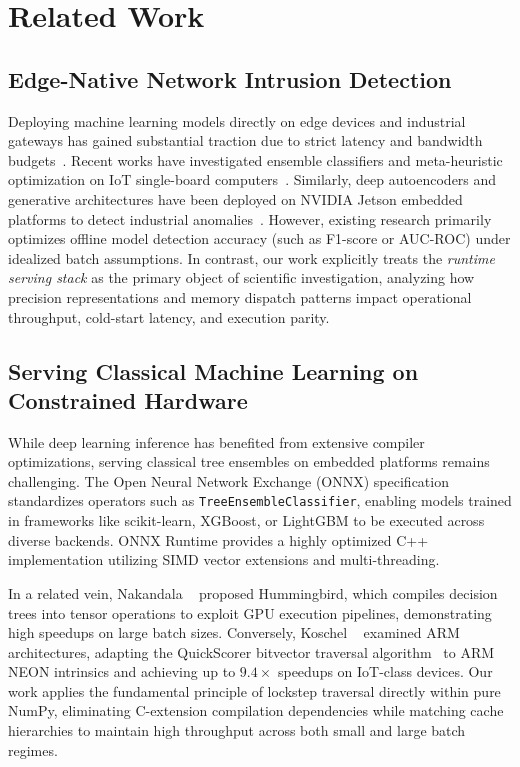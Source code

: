 \section{Related Work}
\label{sec:related_work}

\subsection{Edge-Native Network Intrusion Detection}
Deploying machine learning models directly on edge devices and industrial gateways has gained substantial traction due to strict latency and bandwidth budgets~\cite{sforzin2016rpids}. Recent works have investigated ensemble classifiers and meta-heuristic optimization on IoT single-board computers~\cite{baalaji2025ensemble,asghar2026hedid,zhang2026edgeics}. Similarly, deep autoencoders and generative architectures have been deployed on NVIDIA Jetson embedded platforms to detect industrial anomalies~\cite{hasan2025iiot,diazgorrin2026jetson}. However, existing research primarily optimizes offline model detection accuracy (such as F1-score or AUC-ROC) under idealized batch assumptions. In contrast, our work explicitly treats the \emph{runtime serving stack} as the primary object of scientific investigation, analyzing how precision representations and memory dispatch patterns impact operational throughput, cold-start latency, and execution parity.

\subsection{Serving Classical Machine Learning on Constrained Hardware}
While deep learning inference has benefited from extensive compiler optimizations, serving classical tree ensembles on embedded platforms remains challenging. The Open Neural Network Exchange (ONNX) specification standardizes operators such as \texttt{TreeEnsembleClassifier}, enabling models trained in frameworks like scikit-learn, XGBoost, or LightGBM to be executed across diverse backends. ONNX Runtime provides a highly optimized C++ implementation utilizing SIMD vector extensions and multi-threading. 

In a related vein, Nakandala \etal~\cite{nakandala2020hummingbird} proposed Hummingbird, which compiles decision trees into tensor operations to exploit GPU execution pipelines, demonstrating high speedups on large batch sizes. Conversely, Koschel \etal~\cite{koschel2023arm} examined ARM architectures, adapting the Quick\-Scorer bitvector traversal algorithm~\cite{lucchese2015quickscorer} to ARM NEON intrinsics and achieving up to $9.4\times$ speedups on IoT-class devices. Our work applies the fundamental principle of lockstep traversal directly within pure NumPy, eliminating C-extension compilation dependencies while matching cache hierarchies to maintain high throughput across both small and large batch regimes.

